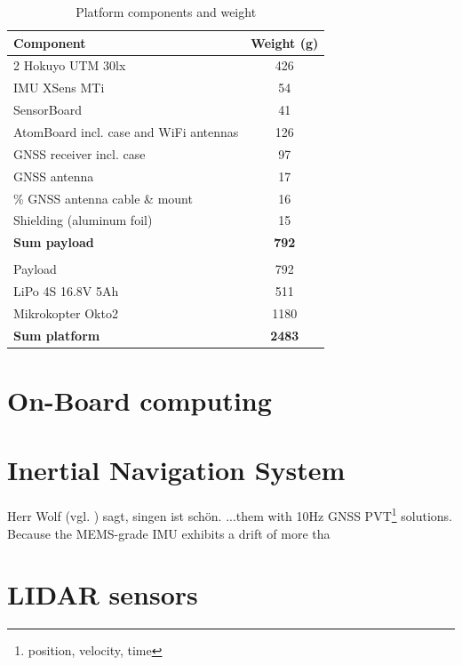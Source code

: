 \begin{table}[t]
\caption{Platform components and weight}
\label{table_platform_weight}
\begin{center}
\begin{tabular}{l|c}
  \textbf{Component} & \textbf{Weight (g)} \\
  \hline
  2 Hokuyo UTM 30lx & 426 \\
  IMU XSens MTi & 54 \\
  SensorBoard  & 41 \\
  AtomBoard incl. case and WiFi antennas & 126 \\
  GNSS receiver incl. case & 97 \\
  GNSS antenna & 17 \\
\% GNSS antenna cable \& mount & 16 \\
  Shielding (aluminum foil) & 15 \\ \hline
  \textbf{Sum payload} & \textbf{792} \\
  \\

  Payload & 792 \\
  LiPo 4S 16.8V 5Ah & 511 \\
  Mikrokopter Okto2 & 1180 \\ \hline
  \textbf{Sum platform} & \textbf{2483} \\
\end{tabular}
\end{center}
\end{table}

\section{On-Board computing}
\label{section_experimental_platform_hardware_computers}

\section{Inertial Navigation System}
\label{section_experimental_platform_hardware_ins}

Herr Wolf (vgl. \autocite{wolf2012}) sagt, \parencite{wolf2012} singen ist schön.
...them with 10Hz GNSS PVT\footnote{position, velocity, time} solutions. Because the MEMS-grade IMU exhibits a drift of more tha

\section{LIDAR sensors}
\label{section_experimental_platform_hardware_lidar}



